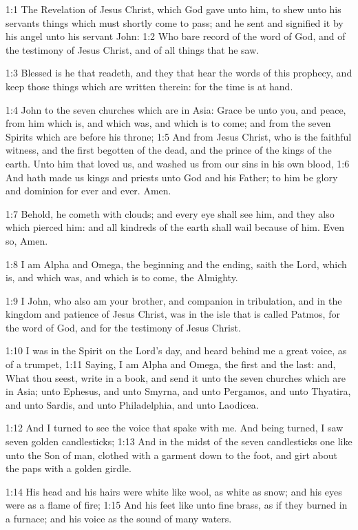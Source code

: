 
1:1 The Revelation of Jesus Christ, which God gave unto him, to shew
unto his servants things which must shortly come to pass; and he sent
and signified it by his angel unto his servant John: 1:2 Who bare
record of the word of God, and of the testimony of Jesus Christ, and
of all things that he saw.

1:3 Blessed is he that readeth, and they that hear the words of this
prophecy, and keep those things which are written therein: for the
time is at hand.

1:4 John to the seven churches which are in Asia: Grace be unto you,
and peace, from him which is, and which was, and which is to come; and
from the seven Spirits which are before his throne; 1:5 And from Jesus
Christ, who is the faithful witness, and the first begotten of the
dead, and the prince of the kings of the earth. Unto him that loved
us, and washed us from our sins in his own blood, 1:6 And hath made us
kings and priests unto God and his Father; to him be glory and
dominion for ever and ever. Amen.

1:7 Behold, he cometh with clouds; and every eye shall see him, and
they also which pierced him: and all kindreds of the earth shall wail
because of him. Even so, Amen.

1:8 I am Alpha and Omega, the beginning and the ending, saith the
Lord, which is, and which was, and which is to come, the Almighty.

1:9 I John, who also am your brother, and companion in tribulation,
and in the kingdom and patience of Jesus Christ, was in the isle that
is called Patmos, for the word of God, and for the testimony of Jesus
Christ.

1:10 I was in the Spirit on the Lord's day, and heard behind me a
great voice, as of a trumpet, 1:11 Saying, I am Alpha and Omega, the
first and the last: and, What thou seest, write in a book, and send it
unto the seven churches which are in Asia; unto Ephesus, and unto
Smyrna, and unto Pergamos, and unto Thyatira, and unto Sardis, and
unto Philadelphia, and unto Laodicea.

1:12 And I turned to see the voice that spake with me. And being
turned, I saw seven golden candlesticks; 1:13 And in the midst of the
seven candlesticks one like unto the Son of man, clothed with a
garment down to the foot, and girt about the paps with a golden
girdle.

1:14 His head and his hairs were white like wool, as white as snow;
and his eyes were as a flame of fire; 1:15 And his feet like unto fine
brass, as if they burned in a furnace; and his voice as the sound of
many waters.

